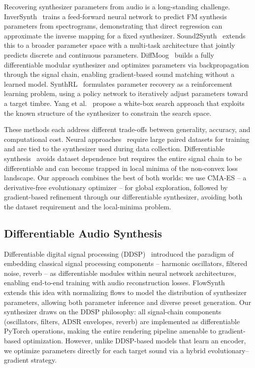 Recovering synthesizer parameters from audio is a long-standing challenge.
InverSynth~\cite{barkan2019inversynth} trains a feed-forward neural network to predict FM synthesis parameters from spectrograms, demonstrating that direct regression can approximate the inverse mapping for a fixed synthesizer.
Sound2Synth~\cite{chen2022sound2synth} extends this to a broader parameter space with a multi-task architecture that jointly predicts discrete and continuous parameters.
DiffMoog~\cite{hayes2024diffmoog} builds a fully differentiable modular synthesizer and optimizes parameters via backpropagation through the signal chain, enabling gradient-based sound matching without a learned model.
SynthRL~\cite{shin2025synthrl} formulates parameter recovery as a reinforcement learning problem, using a policy network to iteratively adjust parameters toward a target timbre.
Yang et al.~\cite{yang2023whitebox} propose a white-box search approach that exploits the known structure of the synthesizer to constrain the search space.

These methods each address different trade-offs between generality, accuracy, and computational cost.
Neural approaches~\cite{barkan2019inversynth,chen2022sound2synth} require large paired datasets for training and are tied to the synthesizer used during data collection.
Differentiable synthesis~\cite{hayes2024diffmoog} avoids dataset dependence but requires the entire signal chain to be differentiable and can become trapped in local minima of the non-convex loss landscape.
Our approach combines the best of both worlds: we use CMA-ES -- a derivative-free evolutionary optimizer -- for global exploration, followed by gradient-based refinement through our differentiable synthesizer, avoiding both the dataset requirement and the local-minima problem.

\subsection{Differentiable Audio Synthesis}

Differentiable digital signal processing (DDSP)~\cite{engel2020ddsp} introduced the paradigm of embedding classical signal processing components -- harmonic oscillators, filtered noise, reverb -- as differentiable modules within neural network architectures, enabling end-to-end training with audio reconstruction losses.
FlowSynth~\cite{yang2025flowsynth} extends this idea with normalizing flows to model the distribution of synthesizer parameters, allowing both parameter inference and diverse preset generation.
Our synthesizer draws on the DDSP philosophy: all signal-chain components (oscillators, filters, ADSR envelopes, reverb) are implemented as differentiable PyTorch operations, making the entire rendering pipeline amenable to gradient-based optimization.
However, unlike DDSP-based models that learn an encoder, we optimize parameters directly for each target sound via a hybrid evolutionary--gradient strategy.

